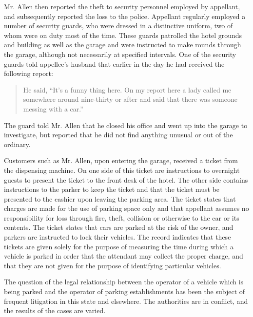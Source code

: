 Mr. Allen then reported the theft to security personnel employed by appellant,
and subsequently reported the loss to the police. Appellant regularly employed
a number of security guards, who were dressed in a distinctive uniform, two of
whom were on duty most of the time. These guards patrolled the hotel grounds
and building as well as the garage and were instructed to make rounds through
the garage, although not necessarily at specified intervals. One of the
security guards told appellee's husband that earlier in the day he had received
the following report:
\begin{quote}
He said, ``It's a funny thing here. On my report here a lady called me somewhere
around nine-thirty or after and said that there was someone messing with a
car.''
\end{quote}
The guard told Mr. Allen that he closed his office and went up into the garage
to investigate, but reported that he did not find anything unusual or out of
the ordinary.

Customers such as Mr. Allen, upon entering the garage, received a ticket from
the dispensing machine. On one side of this ticket are instructions to
overnight guests to present the ticket to the front desk of the hotel. The
other side contains instructions to the parker to keep the ticket and that the
ticket must be presented to the cashier upon leaving the parking area. The
ticket states that charges are made for the use of parking space only and that
appellant assumes no responsibility for loss through fire, theft, collision or
otherwise to the car or its contents. The ticket states that cars are parked at
the risk of the owner, and parkers are instructed to lock their vehicles. The
record indicates that these tickets are given solely for the purpose of
measuring the time during which a vehicle is parked in order that the attendant
may collect the proper charge, and that they are not given for the purpose of
identifying particular vehicles.

The question of the legal relationship between the operator of a vehicle which
is being parked and the operator of parking establishments has been the subject
of frequent litigation in this state and elsewhere. The authorities are in
conflict, and the results of the cases are varied.

